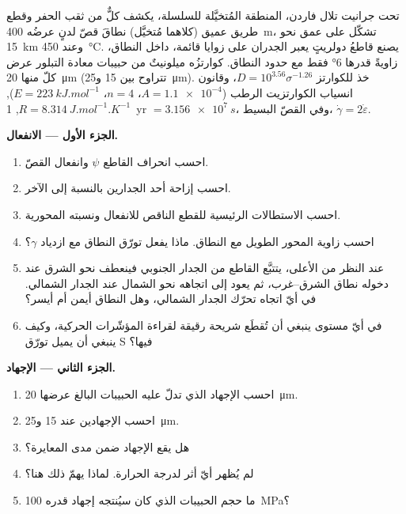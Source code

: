 \begin{problem}
\label{pb:b3:deformation-mechanisms:1}
تحت جرانيت تلال فاردن، المنطقة المُتخيَّلة للسلسلة، يكشف كلٌّ من ثقب الحفر
وقطع طريق عميق (كلاهما مُتخيَّل) نطاقَ قصّ لدنٍ عرضُه \qty{400}{m}،
تشكّل على عمق نحو \qty{15}{km} وعند \qty{450}{\celsius}.
يصنع قاطعُ دولريتٍ يعبر الجدران على زوايا قائمة، داخل النطاق،
زاويةً قدرها \ang{6} فقط مع حدود النطاق. كوارتزُه ميلونيتٌ من حبيبات معادة التبلور
عرض كلّ منها \qty{20}{\micro m} (تتراوح بين 15
و\qty{25}{\micro m}). خذ  للكوارتز $D = 10^{3.56}\sigma^{-1.26}$،
وقانون انسياب الكوارتزيت الرطب ($A = \num{1.1e-4}$، $n = 4$، $E =
\qty{223}{kJ.mol^{-1}}$), $R = \qty{8.314}{J.mol^{-1}.K^{-1}}$, \qty{1}{yr} $=
\qty{3.156e7}{s}$، وفي القصّ البسيط، $\dot\gamma = 2\dot\varepsilon$.

\medskip\noindent\textbf{الجزء الأول --- الانفعال.}
\begin{enumerate}
  \item احسب انحراف القاطع $\psi$ وانفعال القصّ.
  \item احسب إزاحة أحد الجدارين بالنسبة إلى الآخر.
  \item احسب الاستطالات الرئيسية للقطع الناقص للانفعال ونسبته
        المحورية.
  \item احسب زاوية المحور الطويل مع النطاق. ماذا يفعل
        تورّق النطاق مع ازدياد $\gamma$؟
  \item عند النظر من الأعلى، يتتبَّع القاطع من الجدار الجنوبي فينعطف نحو الشرق
        عند دخوله نطاق الشرق--غرب، ثم يعود إلى اتجاهه نحو الشمال عند الجدار الشمالي.
        في أيّ اتجاه تحرّك الجدار الشمالي،
        وهل النطاق أيمن أم أيسر؟
  \item في أيّ مستوى ينبغي أن تُقطَع شريحة رقيقة لقراءة المؤشّرات الحركية،
        وكيف ينبغي أن يميل تورّق S فيها؟
\end{enumerate}

\medskip\noindent\textbf{الجزء الثاني --- الإجهاد.}
\begin{enumerate}[resume]
  \item احسب الإجهاد الذي تدلّ عليه الحبيبات البالغ عرضها \qty{20}{\micro m}.
  \item احسب الإجهادين عند 15 و\qty{25}{\micro m}.
  \item هل يقع الإجهاد ضمن مدى المعايرة؟
  \item لم يُظهر  أيّ أثر لدرجة الحرارة. لماذا يهمّ ذلك
        هنا؟
  \item ما حجم الحبيبات الذي كان سيُنتجه إجهاد قدره \qty{100}{MPa}؟
\end{enumerate}


\end{problem}
